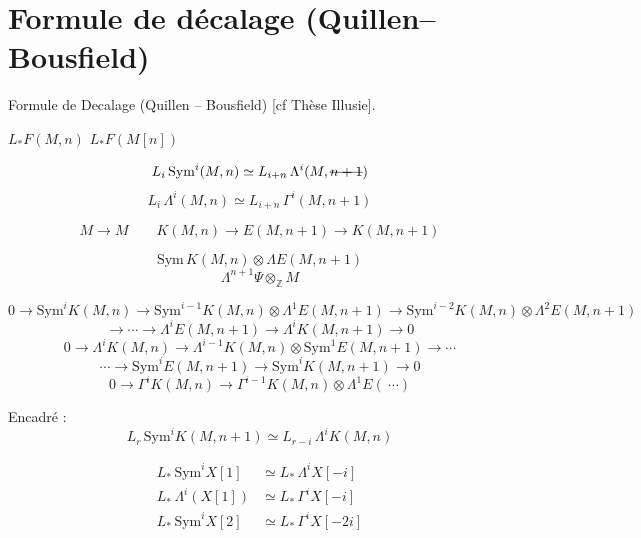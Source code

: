 \documentclass[11pt,a4paper]{article}
\begin{document}
\section{Formule de décalage (Quillen--Bousfield)}


Formule de Decalage (Quillen -- Bousfield) [cf \struck{\ill{}} Thèse Illusie].

$L_{\ast}F(M,n)$ \qquad $L_{\ast}F(M[n])$

\[
  L_i\,\mathrm{Sym}^i(M,n) \simeq L_{i+n}\,\Lambda^i(M,
  \text{\struck{$n+1$}})
\]
\[
  L_i\,\Lambda^i(M,n) \simeq L_{i+n}\,\Gamma^i(M,n+1)
\]

\[
  M \to M \qquad
  K(M,n) \longrightarrow E(M,n+1) \longrightarrow K(M,n+1)
\]

\[
  \mathrm{Sym}\,K(M,n) \otimes \Lambda E(M,n+1)
\]
\[
  \Lambda^{n+1}\Psi \otimes_{\mathbb{Z}} M
\]

\[
  0 \to \mathrm{Sym}^i K(M,n) \to \mathrm{Sym}^{i-1}K(M,n)\otimes\Lambda^1E(M,n+1)
  \to \mathrm{Sym}^{i-2}K(M,n)\otimes\Lambda^2E(M,n+1)
\]
\[
  \to \cdots \to \Lambda^iE(M,n+1) \to \Lambda^iK(M,n+1) \to 0
\]
\[
  0 \to \Lambda^iK(M,n) \to \Lambda^{i-1}K(M,n)\otimes\mathrm{Sym}^1E(M,n+1)
  \to \cdots
\]
\[
  \cdots \to \mathrm{Sym}^iE(M,n+1) \to \mathrm{Sym}^iK(M,n+1) \to 0
\]
\[
  0 \to \Gamma^iK(M,n) \to \Gamma^{i-1}K(M,n)\otimes\Lambda^1E(\ \cdots)
\]

Encadré :
\[
  L_r\,\mathrm{Sym}^i K(M,n+1) \simeq L_{r-i}\,\Lambda^iK(M,n)
\]

\begin{align*}
  L_{\ast}\,\mathrm{Sym}^iX[1] &\simeq L_{\ast}\,\Lambda^iX[-i] \\
  L_{\ast}\,\Lambda^i(X[1]) &\simeq L_{\ast}\,\Gamma^iX[-i] \\
  L_{\ast}\,\mathrm{Sym}^iX[2] &\simeq L_{\ast}\,\Gamma^iX[-2i]
\end{align*}

\end{document}
